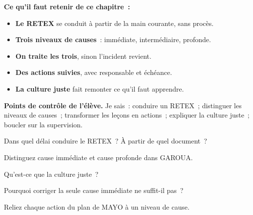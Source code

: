 \separateur

\begin{boxresume}
\textbf{Ce qu'il faut retenir de ce chapitre~:}
\begin{itemize}
    \item \textbf{Le RETEX} se conduit à partir de la main courante, sans
          procès.
    \item \textbf{Trois niveaux de causes}~: immédiate, intermédiaire,
          profonde.
    \item \textbf{On traite les trois}, sinon l'incident revient.
    \item \textbf{Des actions suivies}, avec responsable et échéance.
    \item \textbf{La culture juste} fait remonter ce qu'il faut apprendre.
\end{itemize}
\end{boxresume}

\begin{boxinfo}
\textbf{Points de contrôle de l'élève.} Je sais~: conduire un RETEX~;
distinguer les niveaux de causes~; transformer les leçons en actions~;
expliquer la culture juste~; boucler sur la supervision.
\end{boxinfo}

\bigskip

\begin{boxexo}[title={\ding{45}\quad Exercice~19.1. Délai \niveaubase}]
Dans quel délai conduire le RETEX~? À partir de quel document~?
\end{boxexo}

\begin{boxexo}[title={\ding{45}\quad Exercice~19.2. Causes \niveaubase}]
Distinguez cause immédiate et cause profonde dans GAROUA.
\end{boxexo}

\begin{boxexo}[title={\ding{45}\quad Exercice~19.3. Culture juste \niveaubase}]
Qu'est-ce que la culture juste~?
\end{boxexo}

\begin{boxexo}[title={\ding{45}\quad Exercice~19.4. Symptôme \niveaumoyen}]
Pourquoi corriger la seule cause immédiate ne suffit-il pas~?
\end{boxexo}

\begin{boxexo}[title={\ding{45}\quad Exercice~19.5. Actions \niveaumoyen}]
Reliez chaque action du plan de MAYO à un niveau de cause.
\end{boxexo}

